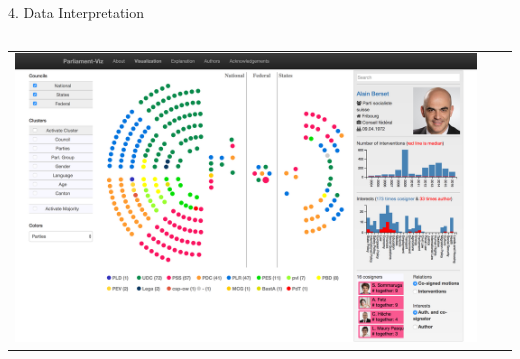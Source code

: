\documentclass[final]{beamer}
\newlength{\onecolwid}
\newlength{\twocolwid}
\begin{document}
\begin{frame}[t]
\begin{columns}[t]
\begin{column}{\twocolwid}
\begin{columns}[t,totalwidth=\twocolwid]
\begin{column}{\onecolwid}
\begin{alertblock}{4. Data Interpretation}
\end{alertblock}


\end{column} %

\end{columns} %


\begin{center}
\begin{tabular}{ccc}
\includegraphics[width=1\linewidth]{img/capture}
\end{tabular}
\end{center}

%
%
%


\begin{columns}[t,totalwidth=\twocolwid] %

\begin{column}{\onecolwid} %


\end{column}
\end{columns}
\end{column}
\end{columns}
\end{frame}
\end{document}
